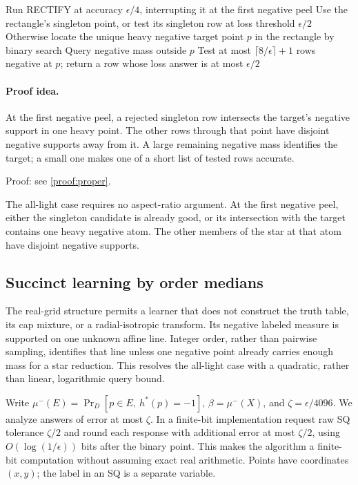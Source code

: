 \begin{algorithm}[t]
\caption{Proper RECTIFY}\label{alg:proper}
Run RECTIFY at accuracy $\epsilon/4$, interrupting it at the first negative peel\;
Use the rectangle's singleton point, or test its singleton row at loss threshold $\epsilon/2$\;
Otherwise locate the unique heavy negative target point $p$ in the rectangle by binary search\;
Query negative mass outside $p$\;
{Test at most $\lceil8/\epsilon\rceil+1$ rows negative at $p$; return a row whose loss answer is at most $\epsilon/2$\;}
\end{algorithm}
\paragraph{Proof idea.}
At the first negative peel, a rejected singleton row intersects the target's negative support in one heavy point. The other rows through that point have disjoint negative supports away from it. A large remaining negative mass identifies the target; a small one makes one of a short list of tested rows accurate.

\noindent Proof: see \cref{proof:proper}.\par


The all-light case requires no aspect-ratio argument. At the first negative peel, either the singleton candidate is already good, or its intersection with the target contains one heavy negative atom. The other members of the star at that atom have disjoint negative supports. 

\subsection{Succinct learning by order medians}\label{sec:fast}
The real-grid structure permits a learner that does not construct the truth table, its cap mixture, or a radial-isotropic transform. Its negative labeled measure is supported on one unknown affine line. Integer order, rather than pairwise sampling, identifies that line unless one negative point already carries enough mass for a star reduction. This resolves the all-light case with a quadratic, rather than linear, logarithmic query bound.

Write $\mu^-(E)=\Pr_D[p\in E,\ h^*(p)=-1]$, $\beta=\mu^-(X)$, and $\zeta=\epsilon/4096$. We analyze answers of error at most $\zeta$. In a finite-bit implementation request raw SQ tolerance $\zeta/2$ and round each response with additional error at most $\zeta/2$, using $O(\log(1/\epsilon))$ bits after the binary point. This makes the algorithm a finite-bit computation without assuming exact real arithmetic. Points have coordinates $(x,y)$; the label in an SQ is a separate variable.


